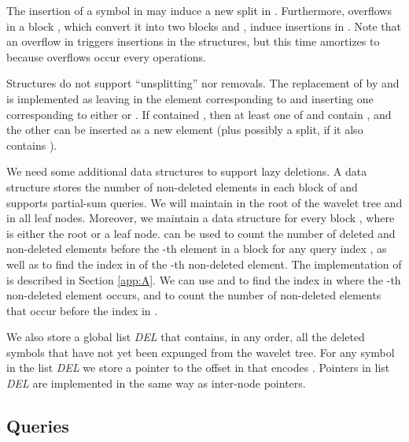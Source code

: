 \documentclass[11pt]{article}
\begin{document}
The insertion of a symbol  in  may induce a new split in . 
Furthermore, overflows in a block , which convert it into two blocks 
 and , induce insertions in .
Note that an overflow in  triggers  insertions in the 
structures, but this  time amortizes to  because overflows
occur every  operations.

Structures  do not support ``unsplitting'' nor removals.
The replacement of  by   and  is implemented as 
leaving in 
 the element corresponding to  and inserting one corresponding 
to either  or . If  contained , then at
least one of  and  contain , and the other can be
inserted as a new element (plus possibly a split, if it also contains ).

We need some additional data structures to support lazy deletions. 
A data structure  stores the number of non-deleted elements 
in each block of  and supports partial-sum queries. 
We will maintain  in the root of the wavelet tree and 
in all leaf nodes. Moreover, we maintain a data structure 
 for every block , where  is either the root 
or a leaf node.  can be used to count the number of deleted 
and non-deleted elements before the -th element in a block  for any query index , as well as to find the index in  of the 
-th non-deleted element. 
The implementation of  is described in Section \ref{app:A}. 
We can use  and  to find the index  in 
where the -th non-deleted element occurs, and to count the number 
of non-deleted elements that occur before the index  in . 

We also store a global list {\em DEL} that contains, in any order, all 
the deleted symbols that have not yet been expunged from the wavelet tree. 
For any symbol  in the list {\em DEL} we store a pointer to the 
offset  in  that encodes . Pointers in 
list {\em DEL} are implemented in the same way  as inter-node
 pointers.

\subsection{Queries}
\end{document}
